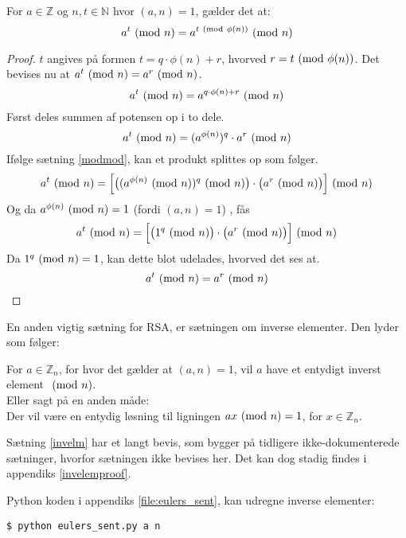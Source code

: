 \begin{sent}
    \label{eulerssent}
    For \(a \in \mathbb{Z}\) og \(n, t \in \mathbb{N}\) hvor \((a, n) = 1\), gælder det at:
    \[a^t \ (\mathrm{mod}\ n) = a^{t \ (\mathrm{mod}\ \phi(n))} \ (\mathrm{mod}\ n)\]
\end{sent}

\begin{proof}
    \(t\) angives på formen \(t = q \cdot \phi(n) + r\), hvorved \(r = t \ (\mathrm{mod}\ \phi(n))\).
    Det bevises nu at \(a^t \ (\mathrm{mod}\ n) = a^r \ (\mathrm{mod}\ n)\).
    \[a^t \ (\mathrm{mod}\ n) = a^{q \cdot \phi(n) + r} \ (\mathrm{mod}\ n)\]
    Først deles summen af potensen op i to dele.
    \[a^t \ (\mathrm{mod}\ n) = (a^{\phi(n)})^q \cdot a^r \ (\mathrm{mod}\ n)\]
    Ifølge sætning \ref{modmod}, kan et produkt splittes op som følger.
    \[a^t \ (\mathrm{mod}\ n) = \Big[ \big( (a^{\phi(n)} \ (\mathrm{mod}\ n))^q \ (\mathrm{mod}\ n) \big) \cdot \big( a^r \ (\mathrm{mod}\ n) \big) \Big] \ (\mathrm{mod}\ n)\] %
    Og da \(a^{\phi(n)} \ (\mathrm{mod}\ n) = 1\) (fordi \((a, n) = 1\)) \cite[90]{krypto}, fås
    \[a^t \ (\mathrm{mod}\ n) = \Big[ \big( 1^q \ (\mathrm{mod}\ n) \big) \cdot \big( a^r \ (\mathrm{mod}\ n) \big) \Big] \ (\mathrm{mod}\ n)\]
    Da \(1^q \ (\mathrm{mod}\ n) = 1\), kan dette blot udelades, hvorved det ses at.
    \[a^t \ (\mathrm{mod}\ n) = a^r \ (\mathrm{mod}\ n)\]
\end{proof}

En anden vigtig sætning for RSA, er sætningen om inverse elementer. Den lyder som følger:

\begin{sent}
    \label{invelm}
    For \(a \in \mathbb{Z}_n\), for hvor det gælder at \((a, n) = 1\), vil \(a\) have et entydigt inverst element \(\ (\mathrm{mod}\ n)\).\cite[93]{krypto}\\
    Eller sagt på en anden måde:\\
    Der vil være en entydig løsning til ligningen \(a x \ (\mathrm{mod}\ n) = 1\), for \(x \in \mathbb{Z}_n\).
\end{sent}

Sætning \ref{invelm} har et langt bevis, som bygger på tidligere ikke-dokumenterede sætninger, hvorfor sætningen ikke bevises her. Det kan dog stadig findes i appendiks \ref{invelemproof}.

Python koden i appendiks \ref{file:eulers_sent}, kan udregne inverse elementer:
\begin{verbatim}
$ python eulers_sent.py a n
\end{verbatim}
